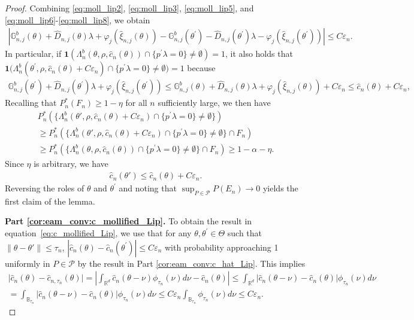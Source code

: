 \documentclass[letterpaper,11pt]{article}
\theoremstyle{myplain}
\theoremstyle{mydefinition}
\theoremstyle{myremark}
\newcommand{\R}{\mathbb{R}}
\numberwithin{equation}{section}
\numberwithin{figure}{section}
\begin{document}
\begin{appendices}
\begin{proof}
Combining \eqref{eq:moll_lip2}, \eqref{eq:moll_lip3}, \eqref{eq:moll_lip5}, and \eqref{eq:moll_lip6}-\eqref{eq:moll_lip8}, we obtain
\begin{align}
\left\vert\mathbb{G}_{n,j}^{b}(\theta )+\hat{D}
_{n,j}(\theta)\lambda +\varphi_j(\hat{\xi}_{n,j}(\theta))-\mathbb{G}_{n,j}^{b}(\theta^\prime)-\hat{D}
_{n,j}(\theta^\prime)\lambda -\varphi_j(\hat{\xi}_{n,j}(\theta^\prime))\right\vert\le C\varepsilon_n.
\end{align}
In particular, if $\mathbf{1}\left(\Lambda_n^b (\theta ,\rho ,\hat{c}_n(\theta))\cap \{p^{\prime }\lambda =0\}\neq \emptyset \right)=1$, it also holds that $\mathbf{1}\big(\Lambda_n^b (\theta^\prime ,\rho ,\hat{c}_n(\theta)+C\varepsilon_n)\cap\{p^{\prime }\lambda =0\}\neq \emptyset \big)=1$ because
\begin{align*}
\mathbb{G}_{n,j}^{b}(\theta^\prime)+\hat{D}
_{n,j}(\theta^\prime)\lambda +\varphi_j(\hat{\xi}_{n,j}(\theta^\prime)) \le \mathbb{G}_{n,j}^{b}(\theta )+\hat{D}
_{n,j}(\theta)\lambda +\varphi_j(\hat{\xi}_{n,j}(\theta))+C\varepsilon_n \le \hat{c}_n(\theta)+C\varepsilon_n,
\end{align*}
Recalling that $P^*_n(F_n)\ge 1-\eta$ for all $n$ sufficiently large, we then have
\begin{multline}
P^*_n\left(\big\{\Lambda_n^b (\theta' ,\rho ,\hat{c}_n(\theta)+C\varepsilon_n)\cap \{p^{\prime }\lambda =0\}\neq \emptyset\big\}\right)\\	
\ge P^*_n\left(\big\{\Lambda_n^b (\theta' ,\rho ,\hat{c}_n(\theta)+C\varepsilon_n)\cap \{p^{\prime }\lambda =0\}\neq \emptyset\big\}\cap F_n \right)	\\
\ge
P^*_n\left(\big\{\Lambda_n^b (\theta ,\rho ,\hat{c}_n(\theta))\cap \{p^{\prime }\lambda =0\}\neq \emptyset\big\} \cap F_n\right)\ge 1-\alpha-\eta.
\end{multline}
Since $\eta$ is arbitrary, we have
\begin{align*}
\hat c_n(\theta')\le \hat c_n(\theta)+C\varepsilon_n.
\end{align*}
Reversing the roles of $\theta$ and $\theta^\prime$ and noting that $\sup_{P\in\mathcal P}P(E_n)\to 0$  yields the first claim of the lemma.

 \textbf{Part \ref{cor:eam_conv:c_mollified_Lip}.}
To obtain the result in equation~\eqref{eq:c_mollified_Lip}, we use that for any $\theta,\theta^\prime \in \Theta$ such that $\|\theta-\theta'\|\le \tau_n$, $|\hat{c}_n(\theta)-\hat{c}_n(\theta^\prime)| \le C \varepsilon_n$ with probability approaching 1 uniformly in $P\in\mathcal P$ by the result in Part \ref{cor:eam_conv:c_hat_Lip}. This implies
\begin{multline*}
\vert\hat{c}_n(\theta)-\hat{c}_{n,\tau_n}(\theta)\vert=\left\vert \int_{\R^d} \hat{c}_n(\theta-\nu)\phi_{\tau_n}(\nu)d\nu - \hat{c}_n(\theta) \right\vert\le  \int_{\R^d}\left\vert \hat{c}_n(\theta-\nu)- \hat{c}_n(\theta) \right\vert \phi_{\tau_n}(\nu)d\nu \\
=\int_{\mathbb{B}_{\tau_n}}\left\vert \hat{c}_n(\theta-\nu)- \hat{c}_n(\theta) \right\vert \phi_{\tau_n}(\nu)d\nu\le C\varepsilon_n \int_{\mathbb{B}_{\tau_n}}\phi_{\tau_n}(\nu)d\nu \le C\varepsilon_n.
\end{multline*}



\end{proof}
\end{appendices}
\end{document}
